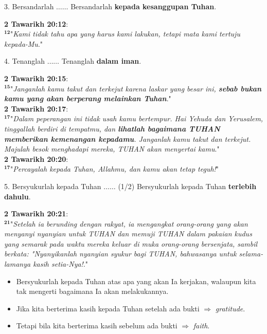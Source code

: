 \documentclass[pdf]{beamer}
\theoremstyle{mystyle}
\begin{document}
\begin{frame}{3. Bersandarlah $\ldots \ldots$}
	Bersandarlah \textbf{kepada kesanggupan Tuhan}.
	
	\bigskip
	\textbf{2 Tawarikh 20:12}: \\
	 $^{\bm{12}}$"\textit{Kami tidak tahu apa yang harus kami lakukan, tetapi mata kami tertuju kepada-Mu}."	 	 
\end{frame}

\begin{frame}{4. Tenanglah $\ldots \ldots$}
	Tenanglah \textbf{dalam iman}.
	
	\bigskip
	\textbf{2 Tawarikh 20:15}: \\
	 $^{\bm{15}}$"\textit{Janganlah kamu takut dan terkejut karena laskar yang besar ini, \textbf{sebab bukan kamu yang akan berperang melainkan Tuhan}}."	 	 \\
	\textbf{2 Tawarikh 20:17}: \\
	 $^{\bm{17}}$"\textit{Dalam peperangan ini tidak usah kamu bertempur. Hai Yehuda dan Yerusalem, tinggallah berdiri di tempatmu, dan \textbf{lihatlah bagaimana TUHAN memberikan kemenangan kepadamu}. Janganlah kamu takut dan terkejut. Majulah besok menghadapi mereka, TUHAN akan menyertai kamu}."	 	 	 \\
	\textbf{2 Tawarikh 20:20}: \\
	 $^{\bm{17}}$"\textit{Percayalah kepada Tuhan, Allahmu, dan kamu akan tetap teguh!}"	 	 	 	 
\end{frame}

\begin{frame}{5. Bersyukurlah kepada Tuhan $\ldots \ldots$ (1/2)}
	Bersyukurlah kepada Tuhan \textbf{terlebih dahulu}.
	
	\bigskip
	\textbf{2 Tawarikh 20:21}: \\
	 $^{\bm{21}}$"\textit{Setelah ia berunding dengan rakyat, ia mengangkat orang-orang yang akan menyanyi nyanyian untuk TUHAN dan memuji TUHAN dalam pakaian kudus yang semarak pada waktu mereka keluar di muka orang-orang bersenjata, sambil berkata: "Nyanyikanlah nyanyian syukur bagi TUHAN, bahwasanya untuk selama-lamanya kasih setia-Nya!}."	 	 
	 
	 \bigskip
	 \begin{itemize}
	 	\item<2-> Bersyukurlah kepada Tuhan atas apa yang akan Ia kerjakan, walaupun kita tak mengerti bagaimana Ia akan melakukannya. 
	 	\item<3-> Jika kita berterima kasih kepada Tuhan setelah ada bukti $\Rightarrow$ \textit{gratitude}. 
	 	\item<4-> Tetapi bila kita berterima kasih sebelum ada bukti $\Rightarrow$ \textit{faith}.
	 \end{itemize}
\end{frame}
\end{document}

